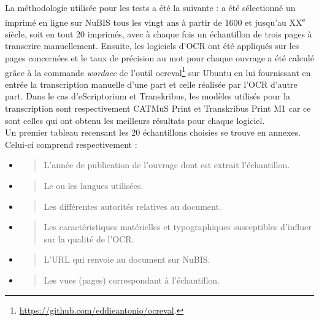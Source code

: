 \documentclass[a4paper,12pt,twoside]{book}
\begin{document}
	La méthodologie utilisée pour les tests a été la suivante : a été
	sélectionné un imprimé en ligne sur NuBIS tous les vingt ans à partir de
	1600 et jusqu'au XX\textsuperscript{e} siècle, soit en tout 20 imprimés,
	avec à chaque fois un échantillon de trois pages à transcrire
	manuellement. Ensuite, les logiciels d'OCR ont été appliqués sur les
	pages concernées et le taux de précision au mot pour chaque ouvrage a
	été calculé grâce à la commande \emph{wordacc} de l'outil
	ocreval\footnote{\url{https://github.com/eddieantonio/ocreval}.}
	sur Ubuntu en lui fournissant en entrée la transcription manuelle d'une
	part et celle réalisée par l'OCR d'autre part. Dans le cas
	d'eScriptorium et Transkribus, les modèles utilisés pour la
	transcription sont respectivement CATMuS Print et Transkribus Print M1
	car ce sont celles qui ont obtenu les meilleurs résultats pour chaque
	logiciel. \\
	
	Un premier tableau recensant les 20 échantillons choisies se trouve en
	annexes. Celui-ci comprend respectivement : \\
	
	\begin{itemize}
		\item
		\begin{quote}
			L'année de publication de l'ouvrage dont est extrait l'échantillon.
		\end{quote}
		\item
		\begin{quote}
			Le ou les langues utilisées.
		\end{quote}
		\item
		\begin{quote}
			Les différentes autorités relatives au document.
		\end{quote}
		\item
		\begin{quote}
			Les caractéristiques matérielles et typographiques susceptibles
			d'influer sur la qualité de l'OCR.
		\end{quote}
		\item
		\begin{quote}
			L'URL qui renvoie au document sur NuBIS.
		\end{quote}
		\item
		\begin{quote}
			Les vues (pages) correspondant à l'échantillon. \\
		\end{quote}
	\end{itemize}
	
\end{document}
